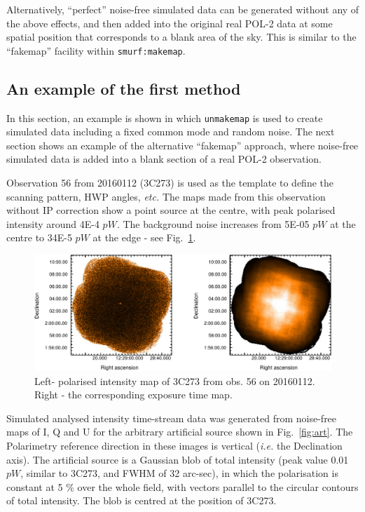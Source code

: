 \documentclass[twoside,11pt]{starlink}
\begin{document}
Alternatively, ``perfect'' noise-free simulated data can be generated
without any of the above effects, and then added into the original real
POL-2 data at some spatial position that corresponds to a blank area of
the sky. This is similar to the ``fakemap'' facility within
\texttt{smurf:makemap}.

\subsection{An example of the first method}
In this section, an example is shown in which \texttt{unmakemap} is used
to create simulated data including a fixed common mode and random noise. The
next section shows an example of the alternative ``fakemap'' approach,
where noise-free simulated data is added into a blank section of a real
POL-2 observation.

Observation 56 from 20160112 (3C273) is used as the template to define the
scanning pattern, HWP angles, \emph{etc.} The maps made from this
observation without IP correction show a point source at the centre, with
peak polarised intensity around 4E-4 $pW$. The background noise increases from
5E-05 $pW$ at the centre to 34E-5 $pW$ at the edge - see Fig.~\ref{fig:3c273}.

\begin{figure}
\includegraphics[width=\columnwidth]{3c273}
\caption{Left- polarised intensity map of 3C273 from obs. 56 on 20160112.
Right - the corresponding exposure time map.}
\label{fig:3c273}
\end{figure}

Simulated analysed intensity time-stream data was generated from noise-free
maps of I, Q and U for the arbitrary artificial source shown in
Fig.~\ref{fig:art}. The Polarimetry reference direction in these images
is vertical (\emph{i.e.} the Declination axis). The artificial source is
a Gaussian blob of total intensity (peak value 0.01 $pW$, similar to
3C273, and FWHM of 32 arc-sec), in which the polarisation is constant at
5 \% over the whole field, with vectors parallel to the circular contours
of total intensity. The blob is centred at the position of 3C273.
\end{document}
